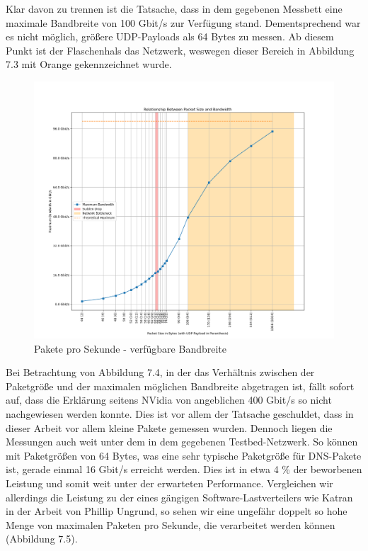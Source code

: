 Klar davon zu trennen ist die Tatsache, dass in dem gegebenen Messbett eine maximale Bandbreite von 100 Gbit/s zur Verfügung stand. Dementsprechend war es nicht möglich, größere UDP-Payloads als 64 Bytes zu messen. Ab diesem Punkt ist der Flaschenhals das Netzwerk, weswegen dieser Bereich in Abbildung 7.3 mit Orange gekennzeichnet wurde.
\begin{figure}
    \centering
    \includegraphics[width=1\linewidth]{images/pps_bandwidth.png}
    \caption{Pakete pro Sekunde - verfügbare Bandbreite}
    \label{fig:enter-label}
\end{figure}
Bei Betrachtung von Abbildung 7.4, in der das Verhältnis zwischen der Paketgröße und der maximalen möglichen Bandbreite abgetragen ist, fällt sofort auf, dass die Erklärung seitens NVidia von angeblichen 400 Gbit/s so nicht nachgewiesen werden konnte. Dies ist vor allem der Tatsache geschuldet, dass in dieser Arbeit vor allem kleine Pakete gemessen wurden. Dennoch liegen die Messungen auch weit unter dem in dem gegebenen Testbed-Netzwerk. So können mit Paketgrößen von 64 Bytes, was eine sehr typische Paketgröße für DNS-Pakete ist, gerade einmal 16 Gbit/s erreicht werden. Dies ist in etwa 4 \% der beworbenen Leistung und somit weit unter der erwarteten Performance. Vergleichen wir allerdings die Leistung zu der eines gängigen Software-Lastverteilers wie Katran in der Arbeit von Phillip Ungrund, so sehen wir eine ungefähr doppelt so hohe Menge von maximalen Paketen pro Sekunde, die verarbeitet werden können \cite{ungrund} (Abbildung 7.5).
